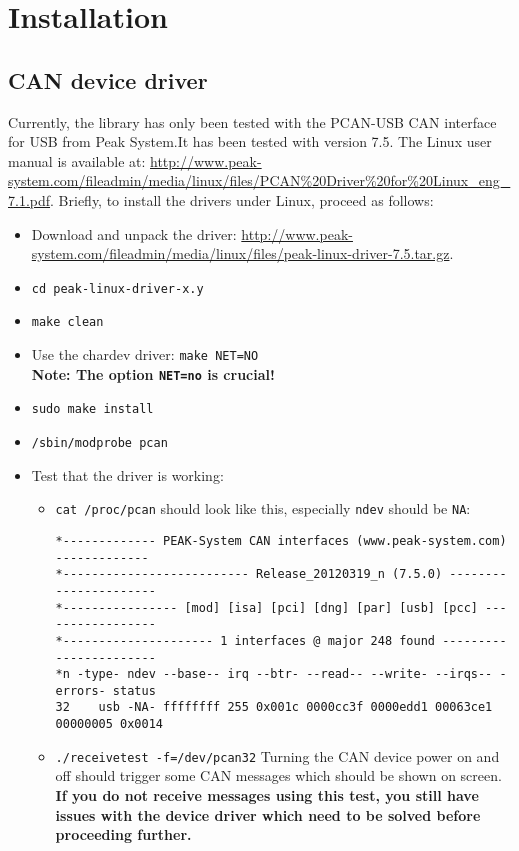 \chapter{Installation}
\label{chap:installation}

\section{CAN device driver}
\label{chap:installation:devicedriver}

Currently, the library has only been tested with the PCAN-USB CAN interface for USB from Peak System.It has been tested with version 7.5. The Linux user manual is available at: \url{http://www.peak-system.com/fileadmin/media/linux/files/PCAN%20Driver%20for%20Linux_eng_7.1.pdf}. Briefly, to install the drivers under Linux, proceed as follows:
  \begin{itemize}
  \item Download and unpack the driver: \url{http://www.peak-system.com/fileadmin/media/linux/files/peak-linux-driver-7.5.tar.gz}.
  \item \texttt{cd peak-linux-driver-x.y}
  \item \texttt{make clean}
  \item Use the chardev driver: \texttt{make NET=NO}\\
    {\bf Note: The option \texttt{NET=no} is crucial!}
  \item \texttt{sudo make install}
  \item \texttt{/sbin/modprobe pcan}

  \item Test that the driver is working:
    \begin{itemize}
    \item \texttt{cat /proc/pcan} should look like this, especially \texttt{ndev} should be \texttt{NA}:
{\scriptsize
\begin{verbatim}
*------------- PEAK-System CAN interfaces (www.peak-system.com) -------------
*-------------------------- Release_20120319_n (7.5.0) ----------------------
*---------------- [mod] [isa] [pci] [dng] [par] [usb] [pcc] -----------------
*--------------------- 1 interfaces @ major 248 found -----------------------
*n -type- ndev --base-- irq --btr- --read-- --write- --irqs-- -errors- status
32    usb -NA- ffffffff 255 0x001c 0000cc3f 0000edd1 00063ce1 00000005 0x0014
\end{verbatim}}
\item \texttt{./receivetest -f=/dev/pcan32} Turning the CAN device power on and off should trigger some CAN messages which should be shown on screen. {\bf If you do not receive messages using this test, you still have issues with the device driver which need to be solved before proceeding further.}
    \end{itemize}
  \end{itemize}

